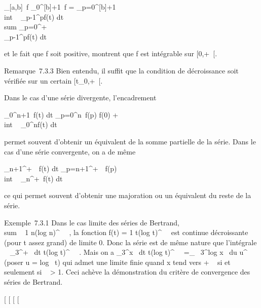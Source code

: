 \documentclass[]{article}
\begin{document}
\int  _[a,b]~f
\leq\int  _0^[b]+1~f =
\sum _p=0^[b]+1~
\\int  ~
_p-1^pf(t) dt \leq\\sum
_p=0^+\infty~\\\int
  _p-1^pf(t) dt

et le fait que f soit positive, montrent que f est intégrable sur
[0,+\infty~[.

Remarque~7.3.3 Bien entendu, il suffit que la condition de décroissance
soit vérifiée sur un certain [t_0,+\infty~[.

Dans le cas d'une série divergente, l'encadrement

\int  _0^n+1~f(t) dt
\leq\sum _p=0^n~f(p) \leq f(0) +
\\int  ~
_0^nf(t) dt

permet souvent d'obtenir un équivalent de la somme partielle de la
série. Dans le cas d'une série convergente, on a de même

\int  _n+1^+\infty~~f(t) dt
\leq\sum _p=n+1^+\infty~~f(p)
\leq\\int  ~
_n^+\infty~f(t) dt

ce qui permet souvent d'obtenir une majoration ou un équivalent du reste
de la série.

Exemple~7.3.1 Dans le cas limite des séries de Bertrand,
\\sum ~  1
\over n(log n)^\beta~~ ,
la fonction f(t) = 1 \over
t(log t)^\beta~~ est continue
décroissante (pour t assez grand) de limite 0. Donc la série est de même
nature que l'intégrale \int ~
_3^+\infty~ dt \over
t(log t)^\beta~~ . Mais on a
\int  _3^x~ dt
\over t(log t)^\beta~~
=\int  _\log~
3^log x~ du \over
u^\beta~ (poser u = log~ t) qui admet
une limite finie quand x tend vers + \infty~ si et seulement si \beta~
> 1. Ceci achève la démonstration du critère de convergence
des séries de Bertrand.

[
[
[
[
\end{document}
